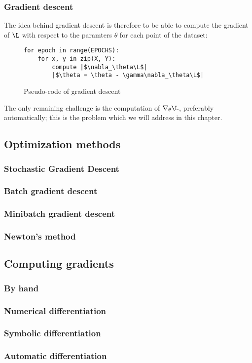 \subsubsection{Gradient descent}
The idea behind gradient descent is therefore to be able to compute the gradient of $\L$ with respect to the paramters $\theta$ for each point of the dataset:
\begin{figure}[H]
    \centering 
    \begin{minipage}{0.4\textwidth}
    \begin{verbatim}
for epoch in range(EPOCHS):
    for x, y in zip(X, Y):
        compute |$\nabla_\theta\L$|
        |$\theta = \theta - \gamma\nabla_\theta\L$|
    \end{verbatim}
    \end{minipage}
    \caption{Pseudo-code of gradient descent}
\end{figure}
The only remaining challenge is the computation of $\nabla_\theta\L$, preferably automatically; this is the problem which we will address in this chapter.

\subsection{Optimization methods}
\subsubsection{Stochastic Gradient Descent}
\subsubsection{Batch gradient descent}
\subsubsection{Minibatch gradient descent}
\subsubsection{Newton's method}

\subsection{Computing gradients}
\subsubsection{By hand}
\subsubsection{Numerical differentiation}
\subsubsection{Symbolic differentiation}
\subsubsection{Automatic differentiation}